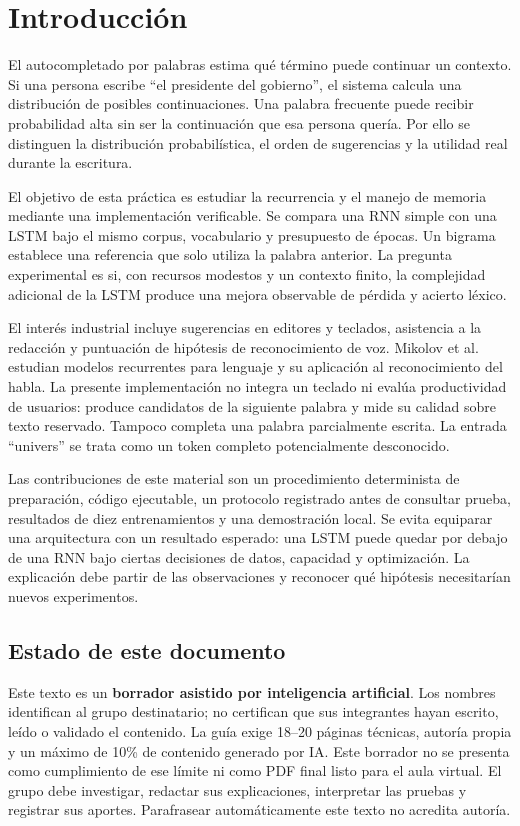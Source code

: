 \section{Introducción}
El autocompletado por palabras estima qué término puede continuar un
contexto. Si una persona escribe ``el presidente del gobierno'', el
sistema calcula una distribución de posibles continuaciones. Una palabra
frecuente puede recibir probabilidad alta sin ser la continuación que esa
persona quería. Por ello se distinguen la distribución probabilística,
el orden de sugerencias y la utilidad real durante la escritura.

El objetivo de esta práctica es estudiar la recurrencia y el manejo de
memoria mediante una implementación verificable. Se compara una RNN
simple con una LSTM bajo el mismo corpus, vocabulario y presupuesto de
épocas. Un bigrama establece una referencia que solo utiliza la palabra
anterior. La pregunta experimental es si, con recursos modestos y un
contexto finito, la complejidad adicional de la LSTM produce una mejora
observable de pérdida y acierto léxico.

El interés industrial incluye sugerencias en editores y teclados,
asistencia a la redacción y puntuación de hipótesis de reconocimiento de
voz. Mikolov et al.~\cite{mikolov2010} estudian modelos recurrentes para
lenguaje y su aplicación al reconocimiento del habla. La presente
implementación no integra un teclado ni evalúa productividad de usuarios:
produce candidatos de la siguiente palabra y mide su calidad sobre texto
reservado. Tampoco completa una palabra parcialmente escrita. La entrada
``univers'' se trata como un token completo potencialmente desconocido.

Las contribuciones de este material son un procedimiento determinista de
preparación, código ejecutable, un protocolo registrado antes de consultar
prueba, resultados de diez entrenamientos y una demostración local.
Se evita equiparar una arquitectura con un resultado esperado: una LSTM
puede quedar por debajo de una RNN bajo ciertas decisiones de datos,
capacidad y optimización. La explicación debe partir de las observaciones
y reconocer qué hipótesis necesitarían nuevos experimentos.

\subsection{Estado de este documento}
Este texto es un \textbf{borrador asistido por inteligencia artificial}.
Los nombres identifican al grupo destinatario; no certifican que sus
integrantes hayan escrito, leído o validado el contenido. La guía exige
18--20 páginas técnicas, autoría propia y un máximo de 10\% de contenido
generado por IA. Este borrador no se presenta como cumplimiento de ese
límite ni como PDF final listo para el aula virtual. El grupo debe
investigar, redactar sus explicaciones, interpretar las pruebas y registrar
sus aportes. Parafrasear automáticamente este texto no acredita autoría.

